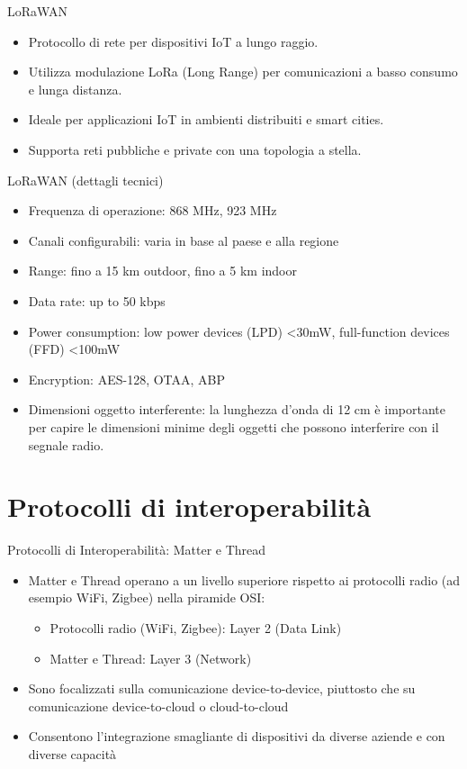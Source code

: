 \documentclass{beamer}
\begin{document}
	\begin{frame}{LoRaWAN}
		\begin{itemize}
			\item Protocollo di rete per dispositivi IoT a lungo raggio.
			\item Utilizza modulazione LoRa (Long Range) per comunicazioni a basso consumo e lunga distanza.
			\item Ideale per applicazioni IoT in ambienti distribuiti e smart cities.
			\item Supporta reti pubbliche e private con una topologia a stella.
		\end{itemize}
	\end{frame}
	\begin{frame}{LoRaWAN (dettagli tecnici)}
		\begin{itemize}
			\item Frequenza di operazione: 868 MHz, 923 MHz
			\item Canali configurabili: varia in base al paese e alla regione
			\item Range: fino a 15 km outdoor, fino a 5 km indoor
			\item Data rate: up to 50 kbps
			\item Power consumption: low power devices (LPD) <30mW, full-function devices (FFD) <100mW
			\item Encryption: AES-128, OTAA, ABP
			\item Dimensioni oggetto interferente: la lunghezza d'onda di 12 cm è importante per capire le dimensioni minime degli oggetti che possono interferire con il segnale radio.
		\end{itemize}
	\end{frame}
	
	\section{Protocolli di interoperabilità}
	\begin{frame}{Protocolli di Interoperabilità: Matter e Thread}
		\begin{itemize}
			\item Matter e Thread operano a un livello superiore rispetto ai protocolli radio (ad esempio WiFi, Zigbee) nella piramide OSI:
			\begin{itemize}
				\item Protocolli radio (WiFi, Zigbee): Layer 2 (Data Link)
				\item Matter e Thread: Layer 3 (Network)
			\end{itemize}
			\item Sono focalizzati sulla comunicazione device-to-device, piuttosto che su comunicazione device-to-cloud o cloud-to-cloud
			\item Consentono l'integrazione smagliante di dispositivi da diverse aziende e con diverse capacità
		\end{itemize}
	\end{frame}
	
\end{document}
